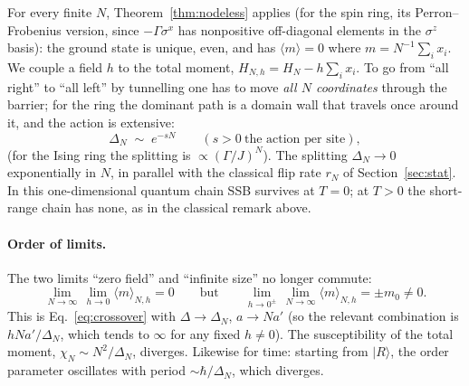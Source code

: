 \documentclass[11pt,a4paper]{article}
\theoremstyle{definition}
\theoremstyle{remark}
\newcommand{\hb}{\hbar}
\newcommand{\ket}[1]{|#1\rangle}
\newcommand{\ev}[1]{\langle #1\rangle}
\begin{document}
For every finite $N$, Theorem~\ref{thm:nodeless} applies (for the spin ring, its Perron--Frobenius
version, since $-\Gamma\sigma^x$ has nonpositive off-diagonal elements in the $\sigma^z$ basis): the ground
state is unique, even, and has $\ev{m}=0$ where $m=N^{-1}\sum_ix_i$. We couple a field $h$ to the total
moment, $H_{N,h}=H_N-h\sum_ix_i$. To go from ``all right'' to ``all left'' by tunnelling one has to
move \emph{all $N$ coordinates} through the barrier; for the ring the dominant path is a domain wall that
travels once around it, and the action is extensive:
\begin{equation}
\Delta_N\;\sim\;e^{-sN}\qquad(s>0\ \text{the action per site}),
\label{eq:DeltaN}
\end{equation}
(for the Ising ring the splitting is $\propto(\Gamma/J)^N$). The splitting $\Delta_N\to0$ exponentially in
$N$, in parallel with the classical flip rate $r_N$ of Section~\ref{sec:stat}. In this one-dimensional quantum
chain SSB survives at $T=0$; at $T>0$ the short-range chain has none, as in the classical remark above.

\paragraph{Order of limits.} The two limits ``zero field'' and ``infinite size'' no longer commute:
\begin{equation}
\lim_{N\to\infty}\,\lim_{h\to0}\ev{m}_{N,h}=0
\qquad\text{but}\qquad
\lim_{h\to0^\pm}\,\lim_{N\to\infty}\ev{m}_{N,h}=\pm m_0\neq0 .
\end{equation}
This is Eq.~\eqref{eq:crossover} with $\Delta\to\Delta_N$, $a\to Na'$ (so the relevant combination is
$hNa'/\Delta_N$, which tends to $\infty$ for any fixed $h\neq0$). The susceptibility of the total moment,
$\chi_N\sim N^2/\Delta_N$, diverges. Likewise for time: starting from $\ket{R}$, the order parameter oscillates
with period $\sim\hb/\Delta_N$, which diverges.
\end{document}
